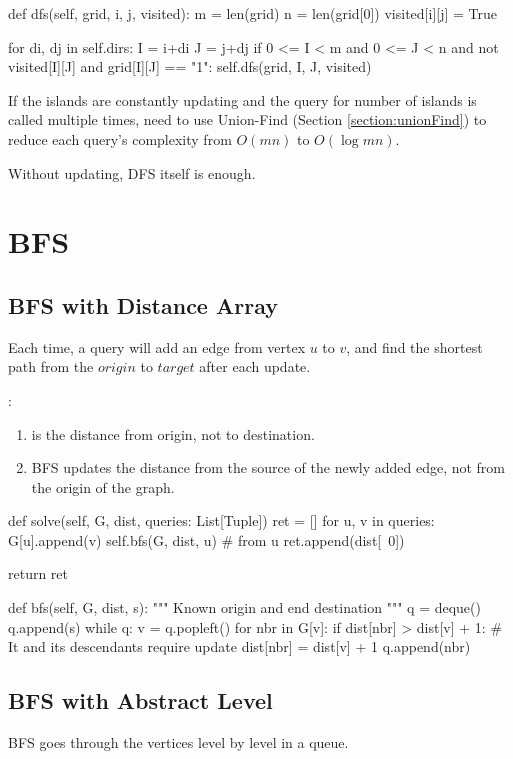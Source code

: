 \begin{python}
  def dfs(self, grid, i, j, visited):
    m = len(grid)
    n = len(grid[0])
    visited[i][j] = True

    for di, dj in self.dirs:
      I = i+di
      J = j+dj
      if 0 <= I < m and 0 <= J < n
        and not visited[I][J]
        and grid[I][J] == "1":
        self.dfs(grid, I, J, visited)
\end{python}
If the islands are constantly updating and the query for number of islands is called multiple times, need to use Union-Find (Section \ref{section:unionFind}) to reduce each query's complexity from $O(mn)$ to $O(\log mn)$.

Without updating, DFS itself is enough.

\section{BFS}
\subsection{BFS with Distance Array}
Each time, a query will add an edge from vertex $u$ to $v$, and find the shortest path from the $origin$ to $target$ after each update. 

:
\begin{enumerate}
\item {} is the distance from origin, not to destination.
\item BFS updates the distance from the source of the newly added edge, not from the origin of the graph.
\end{enumerate}
\begin{python}
def solve(self, G, dist, queries: List[Tuple])
    ret = []
    for u, v in queries:
        G[u].append(v)
        self.bfs(G, dist, u)  # from u
        ret.append(dist[~0])
    
    return ret
    
def bfs(self, G, dist, s):
    """
    Known origin and end destination
    """
    q = deque()
    q.append(s)
    while q:
        v = q.popleft()
        for nbr in G[v]:
            if dist[nbr] > dist[v] + 1:
                # It and its descendants require update
                dist[nbr] = dist[v] + 1
                q.append(nbr)
\end{python}
\subsection{BFS with Abstract Level}
BFS goes through the vertices level by level in a queue. 

